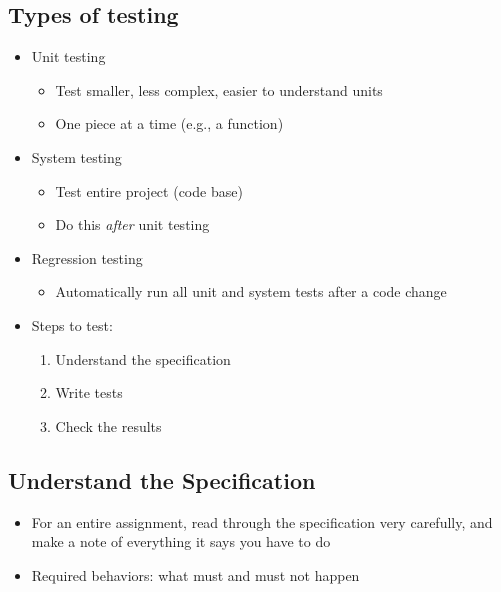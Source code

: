 \subsection{Types of testing}
\begin{itemize}
	\item Unit testing
	\begin{itemize}
		\item Test smaller, less complex, easier to understand units
		\item One piece at a time (e.g., a function)
	\end{itemize}

	\item System testing
	\begin{itemize}
		\item Test entire project (code base)
		\item Do this \textit{after} unit testing
	\end{itemize}

	\item Regression testing
	\begin{itemize}
		\item Automatically run all unit and system tests after a code change
	\end{itemize}

	\item Steps to test:
	\begin{enumerate}
		\item Understand the specification
		\item Write tests
		\item Check the results
	\end{enumerate}
\end{itemize}

\subsection{Understand the Specification}
\begin{itemize}
	\item For an entire assignment, read through the specification very carefully, and make a note of everything it says you have to do
	\item Required behaviors: what must and must not happen
\end{itemize}

